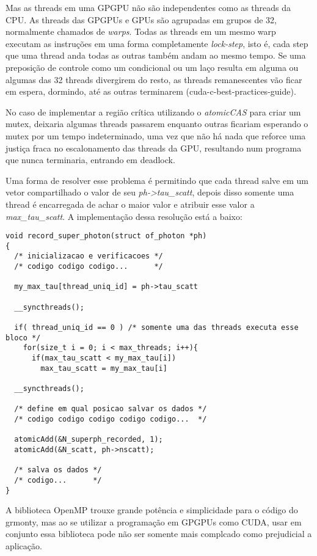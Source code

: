     Mas as threads em uma GPGPU não são independentes como as threads da CPU. As threads das GPGPUs e GPUs são agrupadas em grupos de 32, normalmente chamados de \textit{warps}. Todas as threads em um mesmo warp executam as instruções em uma forma completamente \textit{lock-step}, isto é, cada step que uma thread anda todas as outras também andam ao mesmo tempo. Se uma preposição de controle como um condicional ou um laço resulta em alguma ou algumas das 32 threads divergirem do resto, as threads remanescentes vão ficar em espera, dormindo, até as outras terminarem (cuda-c-best-practices-guide).

    No caso de implementar a região crítica utilizando o \textit{atomicCAS} para criar um mutex, deixaria algumas threads passarem enquanto outras ficariam esperando o mutex por um tempo indeterminado, uma vez que não há nada que reforce uma justiça fraca no escalonamento das threads da GPU, resultando num programa que nunca terminaria, entrando em deadlock.

    Uma forma de resolver esse problema é permitindo que cada thread salve em um vetor compartilhado o valor de seu \textit{ph->tau\_scatt}, depois disso somente uma thread é encarregada de achar o maior valor e atribuir esse valor a \textit{max\_tau\_scatt}. A implementação dessa resolução está a baixo:

    \begin{lstlisting}
void record_super_photon(struct of_photon *ph)
{
  /* inicializacao e verificacoes */
  /* codigo codigo codigo...      */

  my_max_tau[thread_uniq_id] = ph->tau_scatt

  __syncthreads();

  if( thread_uniq_id == 0 ) /* somente uma das threads executa esse bloco */
    for(size_t i = 0; i < max_threads; i++){
      if(max_tau_scatt < my_max_tau[i])
        max_tau_scatt = my_max_tau[i]

  __syncthreads();

  /* define em qual posicao salvar os dados */
  /* codigo codigo codigo codigo codigo...  */

  atomicAdd(&N_superph_recorded, 1);
  atomicAdd(&N_scatt, ph->nscatt);

  /* salva os dados */
  /* codigo...      */
}
    \end{lstlisting}

    A biblioteca OpenMP trouxe grande potência e simplicidade para o código do grmonty, mas ao se utilizar a programação em GPGPUs como CUDA, usar em conjunto essa biblioteca pode não ser somente mais complcado como prejudicial a aplicação.


